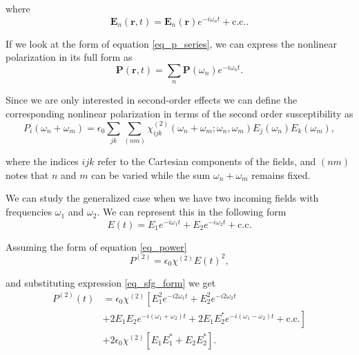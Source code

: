 where
\begin{equation}
\mathbf{E}_{n}(\mathbf{r},t) = \mathbf{E}_{n}(\mathbf{r})e^{-i\omega_{n}t} + \text{c.c.}.
\end{equation}

If we look at the form of equation \eqref{eq_p_series}, we can express the nonlinear polarization in its full form as
\begin{equation}
\mathbf{P}(\mathbf{r},t) = \sum_{n}\mathbf{P}(\omega_{n})e^{-i\omega_{n}t}.
\end{equation}

Since we are only interested in second-order effects we can define the corresponding nonlinear polarization in terms of the second order susceptibility as
\begin{equation}
P_{i}(\omega_{n} + \omega_{m}) = \epsilon_{0}\sum_{jk}\sum_{(nm)}\chi^{(2)}_{ijk}(\omega_{n}+\omega_{m};\omega_{n},\omega_{m})E_{j}(\omega_{n})E_{k}(\omega_{m}),\label{eq_nonlin_p}
\end{equation}

where the indices $ijk$ refer to the Cartesian components of the fields, and $(nm)$ notes that $n$ and $m$ can be varied while the sum $\omega_{n} + \omega_{m}$ remains fixed.

We can study the generalized case when we have two incoming fields with frequencies $\omega_{1}$ and $\omega_{2}$. We can represent this in the following form
\begin{equation}
E(t) = E_{1}e^{-i\omega_{1}t} + E_{2}e^{-i\omega_{2}t} + \text{c.c.}\label{eq_sfg_form}
\end{equation}

Assuming the form of equation \eqref{eq_power}
\begin{equation}
P^{(2)} = \epsilon_{0}\chi^{(2)}E(t)^{2},
\end{equation}

and substituting expression \eqref{eq_sfg_form} we get
\begin{align}
P^{(2)}(t) &= \epsilon_{0}\chi^{(2)}\left[E^{2}_{1}e^{-i2\omega_{1}t} + E^{2}_{2}e^{-i2\omega_{2}t}\right.\nonumber\\
&+\left. 2E_{1}E_{2}e^{-i(\omega_{1}+\omega_{2})t} + 2E_{1}E^{\ast}_{2}e^{-i(\omega_{1}-\omega_{2})t} + \text{c.c.}\right]\nonumber\\
&+ 2\epsilon_{0}\chi^{(2)}\left[E_{1}E^{\ast}_{1} + E_{2}E^{\ast}_{2}\right].\label{eq_second_order}
\end{align}

